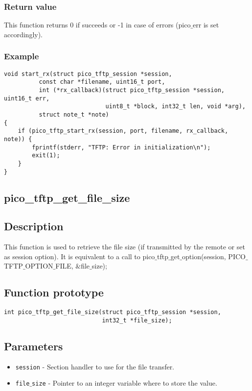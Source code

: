 \subsubsection*{Return value}
This function returns 0 if succeeds or -1 in case of errors (pico$\_$err is set accordingly).

\subsubsection*{Example}
\begin{verbatim}
void start_rx(struct pico_tftp_session *session,
          const char *filename, uint16_t port,
          int (*rx_callback)(struct pico_tftp_session *session, uint16_t err,
                             uint8_t *block, int32_t len, void *arg),
          struct note_t *note)
{
    if (pico_tftp_start_rx(session, port, filename, rx_callback, note)) {
        fprintf(stderr, "TFTP: Error in initialization\n");
        exit(1);
    }
}
\end{verbatim}


\subsection{pico\_tftp\_get\_file\_size}

\subsection*{Description}
This function is used to retrieve the file size (if transmitted by the remote or set as session option). It is equivalent to a call to pico$\_$tftp$\_$get$\_$option(session, PICO$\_$TFTP$\_$OPTION$\_$FILE, $\&$file$\_$size);

\subsection*{Function prototype}
\begin{verbatim}
int pico_tftp_get_file_size(struct pico_tftp_session *session,
                            int32_t *file_size);
\end{verbatim}

\subsection*{Parameters}
\begin{itemize}[noitemsep]
\item \texttt{session} - Section handler to use for the file transfer.
\item \texttt{file$\_$size} - Pointer to an integer variable where to store the value.
\end{itemize}

